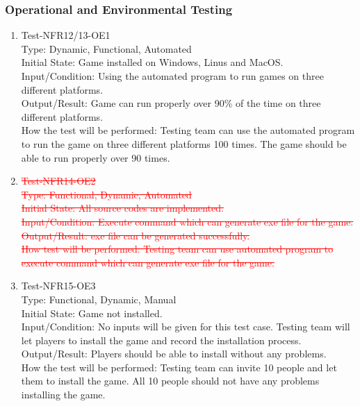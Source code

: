 \documentclass[12pt]{article}
\begin{document}
\subsubsection{Operational and Environmental Testing}
\begin{enumerate}[1.]
\item Test-NFR12/13-OE1\\
Type: Dynamic, Functional, Automated\\
Initial State: Game installed on Windows, Linus and MacOS.\\
Input/Condition: Using the automated program to run games
on three different platforms.\\
Output/Result: Game can run properly over 90\% of the time on three different platforms.\\
How the test will be performed: Testing team can use
 the automated program to run the game on three different 
 platforms 100 times. The game should be able to run 
 properly over 90 times.
\item \textcolor{red}{\st{Test-NFR14-OE2\\
Type: Functional, Dynamic, Automated\\
Initial State: All source codes are implemented.\\
Input/Condition: Execute 
command which can generate exe file for the game.\\
Output/Result: exe file can be generated successfully.\\
How test will be performed: Testing team can use
automated program to execute command which can generate
exe file for the game. }}
\item Test-NFR15-OE3\\
Type: Functional, Dynamic, Manual\\
Initial State: Game not installed.\\
Input/Condition: No inputs will be given for this test 
case. Testing team will let players to install the game
and record the installation 
process.\\
Output/Result: Players should be able to install without
any problems.\\
How the test will be performed: Testing team can 
invite 10 people and let them to install the game. All
10 people should not have any problems installing the 
game.
\end{enumerate} \newpage
\end{document}
